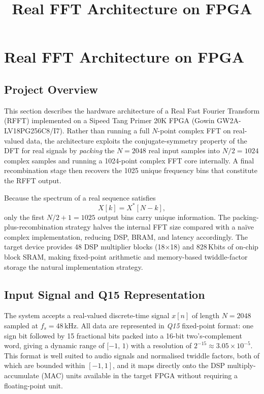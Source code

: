 \documentclass[12pt, a4paper]{article}
\title{\textbf{Real FFT Architecture on FPGA}}
\author{}
\date{}
\begin{document}
\maketitle
\tableofcontents
\newpage

\section{Real FFT Architecture on FPGA}

\subsection{Project Overview}

This section describes the hardware architecture of a Real Fast Fourier
Transform (RFFT) implemented on a Sipeed Tang Primer 20K FPGA
(Gowin GW2A-LV18PG256C8/I7).
Rather than running a full $N$-point complex FFT on real-valued data, the
architecture exploits the conjugate-symmetry property of the DFT for real
signals by \emph{packing} the $N = 2048$ real input samples into $N/2 = 1024$
complex samples and running a 1024-point complex FFT core internally.
A final recombination stage then recovers the 1025 unique frequency bins that
constitute the RFFT output.

Because the spectrum of a real sequence satisfies
\begin{equation}
    X[k] = X^{*}[N-k],
\end{equation}
only the first $N/2 + 1 = 1025$ output bins carry unique information.
The packing-plus-recombination strategy halves the internal FFT size compared
with a na\"{i}ve complex implementation, reducing DSP, BRAM, and latency
accordingly.
The target device provides 48 DSP multiplier blocks (18$\times$18) and
828\,Kbits of on-chip block SRAM, making fixed-point arithmetic and
memory-based twiddle-factor storage the natural implementation strategy.

\subsection{Input Signal and Q15 Representation}

The system accepts a real-valued discrete-time signal $x[n]$ of length
$N = 2048$ sampled at $f_s = 48\,\text{kHz}$.
All data are represented in \emph{Q15} fixed-point format: one sign bit
followed by 15 fractional bits packed into a 16-bit two's-complement word,
giving a dynamic range of $[-1,\,1)$ with a resolution of
$2^{-15} \approx 3.05 \times 10^{-5}$.
This format is well suited to audio signals and normalised twiddle factors,
both of which are bounded within $[-1, 1]$, and it maps directly onto the
DSP multiply-accumulate (MAC) units available in the target FPGA without
requiring a floating-point unit.
\end{document}
